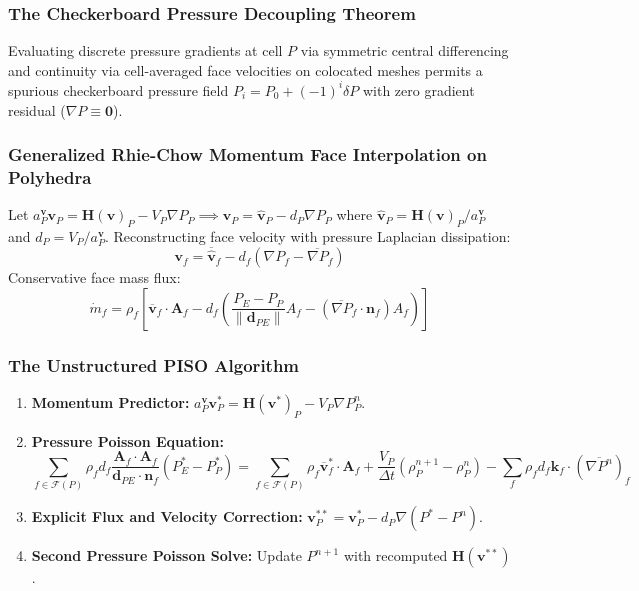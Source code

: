 \documentclass[11pt,a4paper]{article}
\begin{document}
\subsubsection{The Checkerboard Pressure Decoupling Theorem}
Evaluating discrete pressure gradients at cell $P$ via symmetric central differencing and continuity via cell-averaged face velocities on colocated meshes permits a spurious checkerboard pressure field $P_i = P_0 + (-1)^i \delta P$ with zero gradient residual ($\nabla P \equiv \mathbf{0}$).

\subsubsection{Generalized Rhie-Chow Momentum Face Interpolation on Polyhedra}
Let $a_P^{\mathbf{v}} \mathbf{v}_P = \mathbf{H}(\mathbf{v})_P - V_P \nabla P_P \implies \mathbf{v}_P = \hat{\mathbf{v}}_P - d_P \nabla P_P$ where $\hat{\mathbf{v}}_P = \mathbf{H}(\mathbf{v})_P / a_P^{\mathbf{v}}$ and $d_P = V_P / a_P^{\mathbf{v}}$.
Reconstructing face velocity with pressure Laplacian dissipation:
\begin{equation}
\mathbf{v}_f = \overline{\hat{\mathbf{v}}}_f - d_f \left( \nabla P_f - \overline{\nabla P}_f \right)
\end{equation}
Conservative face mass flux:
\begin{equation}
\dot{m}_f = \rho_f \left[ \overline{\mathbf{v}}_f \cdot \mathbf{A}_f - d_f \left( \frac{P_E - P_P}{\|\mathbf{d}_{PE}\|} A_f - (\overline{\nabla P}_f \cdot \mathbf{n}_f) A_f \right) \right]
\end{equation}

\subsubsection{The Unstructured PISO Algorithm}
\begin{enumerate}[leftmargin=*]
    \item \textbf{Momentum Predictor:} $a_P^{\mathbf{v}} \mathbf{v}_P^* = \mathbf{H}(\mathbf{v}^*)_P - V_P \nabla P_P^n$.
    \item \textbf{Pressure Poisson Equation:}
    \begin{equation}
    \sum_{f \in \mathcal{F}(P)} \rho_f d_f \frac{\mathbf{A}_f \cdot \mathbf{A}_f}{\mathbf{d}_{PE} \cdot \mathbf{n}_f} (P_E^* - P_P^*) = \sum_{f \in \mathcal{F}(P)} \rho_f \overline{\mathbf{v}}_f^* \cdot \mathbf{A}_f + \frac{V_P}{\Delta t}(\rho_P^{n+1} - \rho_P^n) - \sum_{f} \rho_f d_f \mathbf{k}_f \cdot (\overline{\nabla P^n})_f
    \end{equation}
    \item \textbf{Explicit Flux and Velocity Correction:} $\mathbf{v}_P^{**} = \mathbf{v}_P^* - d_P \nabla(P^* - P^n)$.
    \item \textbf{Second Pressure Poisson Solve:} Update $P^{n+1}$ with recomputed $\mathbf{H}(\mathbf{v}^{**})$.
\end{enumerate}
\end{document}

